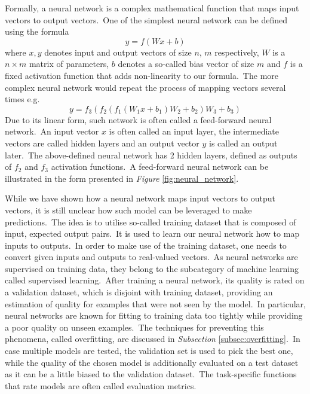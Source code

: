 \documentclass[longabstract, english, mgr]{iithesis}
\theoremstyle{default_theorem_style}\newtheorem{theorem}{Theorem}
\theoremstyle{default_theorem_style}\newtheorem{definition}{Definition}
\begin{document}
\noindent Formally, a neural network is a complex mathematical function that maps input vectors to output
vectors.\ One of the simplest neural network can be defined using the formula
\begin{equation}\label{eq:one_layer_network}
y = f(W x + b)
\end{equation}
where $x, y$ denotes input and output vectors of size $n$, $m$ respectively, $W$ is a $n \times m$ matrix of
parameters, $b$ denotes a so-called bias vector of size $m$ and $f$ is a fixed activation function that
adds non-linearity to our formula.\ The more complex neural network would repeat the process of mapping vectors several
times e.g.
\begin{equation}\label{eq:multi_layer_network}
y = f_3(f_2(f_1(W_1 x + b_1) W_2 + b_2) W_3 + b_3)
\end{equation}
Due to its linear form, such network is often called a feed-forward neural network.\ An input vector $x$ is often
called an input layer, the intermediate vectors are called hidden layers and an output vector $y$ is called
an output later.\ The above-defined neural network has 2 hidden layers, defined as outputs of $f_2$ and $f_3$
activation functions.\ A feed-forward neural network can be illustrated in the form presented in
\textit{Figure} \ref{fig:neural_network}.\newline

\noindent While we have shown how a neural network maps input vectors to output vectors, it is still unclear how such
model can be leveraged to make predictions.\ The idea is to utilise so-called training dataset that is composed of
input, expected output pairs.\ It is used to learn our neural network how to map inputs to
outputs.\ In order to make use of the training dataset, one needs to convert given inputs and outputs
to real-valued vectors.\ As neural networks are supervised on training data, they belong to the subcategory of machine
learning called supervised learning.\ After training a neural network, its quality is rated on a validation dataset,
which is disjoint with training dataset, providing an estimation of quality for examples that were not seen by the
model.\ In particular, neural networks are known for fitting to training data too tightly while providing a poor
quality on unseen examples.\ The techniques for preventing this phenomena, called overfitting, are discussed in
\textit{Subsection} \ref{subsec:overfitting}.\ In case multiple models are tested, the validation set is used to pick
the best one, while the quality of the chosen model is additionally evaluated on a test dataset as it can be a little
biased to the validation dataset.\ The task-specific functions that rate models are often called
evaluation metrics.\newline
\end{document}
